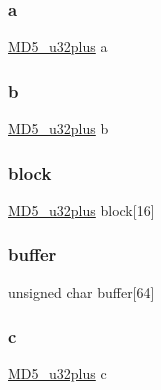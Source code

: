 \subsubsection{\texorpdfstring{a}{a}}
{\footnotesize\ttfamily \mbox{\hyperlink{md5_8h_a7c9e2a59b92cd132f707337f6d940122}{M\+D5\+\_\+u32plus}} a}

\mbox{\label{struct_m_d5___c_t_x_ae7735a3daa065dc9dfab9dd1a512d557}} 
\subsubsection{\texorpdfstring{b}{b}}
{\footnotesize\ttfamily \mbox{\hyperlink{md5_8h_a7c9e2a59b92cd132f707337f6d940122}{M\+D5\+\_\+u32plus}} b}

\mbox{\label{struct_m_d5___c_t_x_ad8cb52dd70ac5316564b1e4b48b0ad7d}} 
\subsubsection{\texorpdfstring{block}{block}}
{\footnotesize\ttfamily \mbox{\hyperlink{md5_8h_a7c9e2a59b92cd132f707337f6d940122}{M\+D5\+\_\+u32plus}} block\mbox{[}16\mbox{]}}

\mbox{\label{struct_m_d5___c_t_x_a59e96eea04541ecd67c3faca41b13feb}} 
\subsubsection{\texorpdfstring{buffer}{buffer}}
{\footnotesize\ttfamily unsigned char buffer\mbox{[}64\mbox{]}}

\mbox{\label{struct_m_d5___c_t_x_a1f90d3ede1c4253a90685d1260482dfc}} 
\subsubsection{\texorpdfstring{c}{c}}
{\footnotesize\ttfamily \mbox{\hyperlink{md5_8h_a7c9e2a59b92cd132f707337f6d940122}{M\+D5\+\_\+u32plus}} c}

